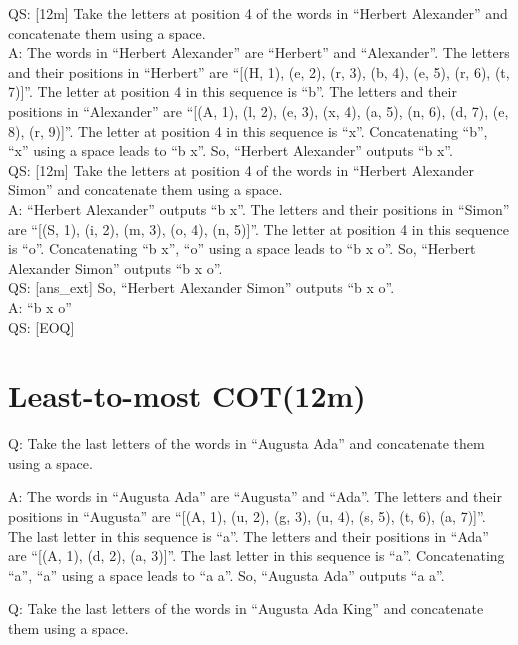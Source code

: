 \documentclass[
]{article}
\begin{document}
QS: {[}12m{]} Take the letters at position 4 of the words in ``Herbert
Alexander'' and concatenate them using a space.\\
A: The words in ``Herbert Alexander'' are ``Herbert'' and ``Alexander''.
The letters and their positions in ``Herbert'' are ``{[}(H, 1), (e, 2),
(r, 3), (b, 4), (e, 5), (r, 6), (t, 7){]}''. The letter at position 4 in
this sequence is ``b''. The letters and their positions in ``Alexander''
are ``{[}(A, 1), (l, 2), (e, 3), (x, 4), (a, 5), (n, 6), (d, 7), (e, 8),
(r, 9){]}''. The letter at position 4 in this sequence is ``x''.
Concatenating ``b'', ``x'' using a space leads to ``b x''. So, ``Herbert
Alexander'' outputs ``b x''.\\
QS: {[}12m{]} Take the letters at position 4 of the words in ``Herbert
Alexander Simon'' and concatenate them using a space.\\
A: ``Herbert Alexander'' outputs ``b x''. The letters and their
positions in ``Simon'' are ``{[}(S, 1), (i, 2), (m, 3), (o, 4), (n,
5){]}''. The letter at position 4 in this sequence is ``o''.
Concatenating ``b x'', ``o'' using a space leads to ``b x o''. So,
``Herbert Alexander Simon'' outputs ``b x o''.\\
QS: {[}ans\_ext{]} So, ``Herbert Alexander Simon'' outputs ``b x o''.\\
A: ``b x o''\\
QS: {[}EOQ{]}

\section{Least-to-most COT(12m)}\label{least-to-most-cot12m}

Q: Take the last letters of the words in ``Augusta Ada'' and concatenate
them using a space.

A: The words in ``Augusta Ada'' are ``Augusta'' and ``Ada''. The letters
and their positions in ``Augusta'' are ``{[}(A, 1), (u, 2), (g, 3), (u,
4), (s, 5), (t, 6), (a, 7){]}''. The last letter in this sequence is
``a''. The letters and their positions in ``Ada'' are ``{[}(A, 1), (d,
2), (a, 3){]}''. The last letter in this sequence is ``a''.
Concatenating ``a'', ``a'' using a space leads to ``a a''. So, ``Augusta
Ada'' outputs ``a a''.

Q: Take the last letters of the words in ``Augusta Ada King'' and
concatenate them using a space.
\end{document}
